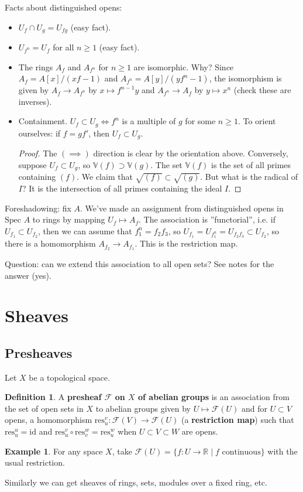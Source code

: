 \documentclass{article}
\theoremstyle{definition}
\newtheorem{example}{Example}[section]
\newtheorem{defn}{Definition}[section]
\begin{document}
Facts about distinguished opens:
\begin{itemize}
    \item $U_f \cap U_g = U_{fg}$ (easy fact).
    \item $U_{f^n} = U_f$ for all $n \ge 1$ (easy fact).
    \item The rings $A_f$ and $A_{f^n}$ for $n\ge 1$ are isomorphic. Why? Since $A_f = A[x]/(xf-1)$ and $A_{f^n} = A[y]/(yf^n-1)$, the isomorphism is given by $A_f \to A_{f^n}$ by $x \mapsto f^{n-1}y$ and $A_{f^n} \to A_f$ by $y \mapsto x^n$ (check these are inverses).
    \item Containment. $U_{f} \subset U_{g} \iff f^n$ is a multiple of $g$ for some $n\ge 1$. To orient ourselves: if $f = g f'$, then $U_f \subset U_g$.
    \begin{proof}
        The $(\implies )$ direction is clear by the orientation above. Conversely, suppose $U_f \subset U_g$, so $\mathbb{V}(f) \supset \mathbb{V}(g)$. The set $\mathbb{V}(f)$ is the set of all primes containing $(f)$. We claim that $\sqrt{(f)} \subset \sqrt{(g)}$. But what is the radical of $I$? It is the intersection of all primes containing the ideal $I$.
    \end{proof}
\end{itemize}

Foreshadowing: fix $A$. We've made an assignment from distinguished opens in $\text{Spec }A$ to rings by mapping $U_f \mapsto A_f$. The association is ''functorial'', i.e. if $U_{f_1} \subset U_{f_2}$, then we can assume that $f_1^n = f_2 f_3$, so $U_{f_1} = U_{f_1^n} = U_{f_2f_3} \subset U_{f_2}$, so there is a homomorphism $A_{f_2} \to A_{f_1}$. This is the restriction map.

\vspace{1mm}
 
Question: can we extend this association to all open sets? See notes for the answer (yes).

\section{Sheaves}
\subsection{Presheaves}
Let $X$ be a topological space. 
\begin{defn}
    A \textbf{presheaf $\mathcal{F}$ on $X$ of abelian groups} is an association from the set of open sets in $X$ to abelian groups given by $U \mapsto \mathcal{F}(U)$ and for $U \subset V$ opens, a homomorphism $\text{res}_u^v : \mathcal{F}(V) \to \mathcal{F}(U)$ (a \textbf{restriction map}) such that $\text{res}_u^u = \text{id}$ and $\text{res}^v_u \circ \text{res}^w_v = \text{res}^w_u$ when $U \subset V \subset W$ are opens.
\end{defn}
\begin{example}
    For any space $X$, take $\mathcal{F}(U) = \{f : U \to \mathbb{R} \mid f \text{ continuous}\}$ with the usual restriction.
\end{example}
Similarly we can get sheaves of rings, sets, modules over a fixed ring, etc.
\end{document}
